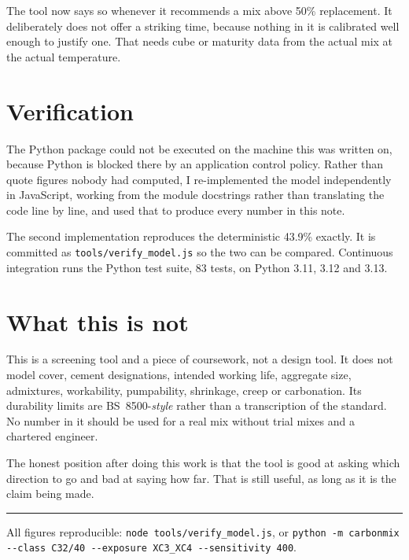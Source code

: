 \documentclass[11pt,a4paper]{article}
\begin{document}
The tool now says so whenever it recommends a mix above 50\% replacement. It deliberately does
not offer a striking time, because nothing in it is calibrated well enough to justify one. That
needs cube or maturity data from the actual mix at the actual temperature.

\section{Verification}

The Python package could not be executed on the machine this was written on, because Python is
blocked there by an application control policy. Rather than quote figures nobody had computed, I
re-implemented the model independently in JavaScript, working from the module docstrings rather
than translating the code line by line, and used that to produce every number in this note.

The second implementation reproduces the deterministic 43.9\% exactly. It is committed as
\texttt{tools/verify\_model.js} so the two can be compared. Continuous integration runs the
Python test suite, 83 tests, on Python 3.11, 3.12 and 3.13.

\section{What this is not}

This is a screening tool and a piece of coursework, not a design tool. It does not model
cover, cement designations, intended working life, aggregate size, admixtures, workability,
pumpability, shrinkage, creep or carbonation. Its durability limits are BS~8500-\emph{style}
rather than a transcription of the standard. No number in it should be used for a real mix
without trial mixes and a chartered engineer.

The honest position after doing this work is that the tool is good at asking which direction to
go and bad at saying how far. That is still useful, as long as it is the claim being made.

\vspace{1em}
\hrule
\vspace{0.6em}
{\small All figures reproducible: \texttt{node tools/verify\_model.js}, or
\texttt{python -m carbonmix -{}-class C32/40 -{}-exposure XC3\_XC4 -{}-sensitivity 400}.}
\end{document}
